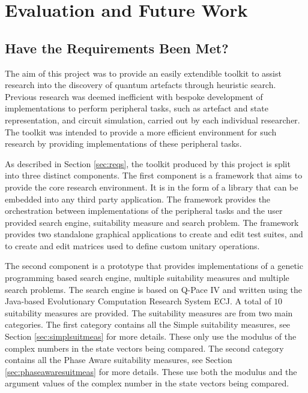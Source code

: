 \chapter{Evaluation and Future Work}
\label{sec:evalandfutwork}

\section{Have the Requirements Been Met?}

The aim of this project was to provide an easily extendible toolkit to assist research into the discovery of quantum artefacts through heuristic search.
Previous research was deemed inefficient with bespoke development of implementations to perform peripheral tasks, such as artefact and state representation, and circuit simulation, carried out by each individual researcher.
The toolkit was intended to provide a more efficient environment for such research by providing implementations of these peripheral tasks.

As described in Section \ref{sec:reqs}, the toolkit produced by this project is split into three distinct components.
The first component is a framework that aims to provide the core research environment.
It is in the form of a library that can be embedded into any third party application.
The framework provides the orchestration between implementations of the peripheral tasks and the user provided search engine, suitability measure and search problem.
The framework provides two standalone graphical applications to create and edit test suites, and to create and edit matrices used to define custom unitary operations.

The second component is a prototype that provides implementations of a genetic programming based search engine, multiple suitability measures and multiple search problems.
The search engine is based on Q-Pace IV\cite{masseythesis} and written using the Java-based Evolutionary Computation Research System ECJ\cite{ecjtool}.
A total of $10$ suitability measures are provided.
The suitability measures are from two main categories.
The first category contains all the Simple suitability measures, see Section \ref{sec:simplsuitmeas} for more details.
These only use the modulus of the complex numbers in the state vectors being compared.
The second category contains all the Phase Aware suitability measures, see Section \ref{sec:phaseawaresuitmeas} for more details.
These use both the modulus and the argument values of the complex number in the state vectors being compared.

